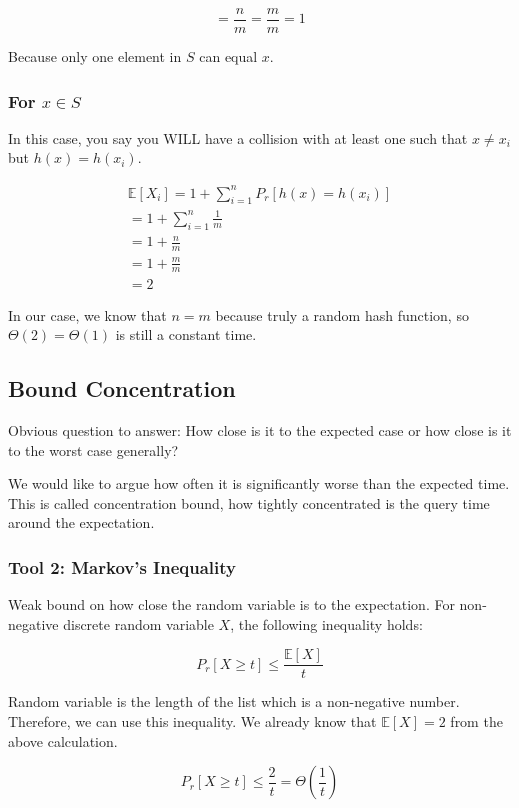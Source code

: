 \documentclass{article}
\begin{document}
$$
 = \frac{n}{m} = \frac{m}{m} = 1
$$

Because only one element in $S$ can equal $x$.

\subsubsection{For $x \in S$}

In this case, you say you WILL have a collision with at least one such that $x \neq x_i$ but $h(x) = h(x_i)$.

\begin{align*}
        \mathbb E[X_i] = 1 + \sum^{n}_{i=1} P_r[h(x) = h(x_i)] \\
        = 1 + \sum^{n}_{i=1} \frac{1}{m} \\
        = 1 + \frac{n}{m} \\
        = 1 + \frac{m}{m} \\
        = 2
\end{align*}

In our case, we know that $n = m$ because truly a random hash function, so $\Theta(2) = \Theta(1)$ is still a constant time.

\subsection{Bound Concentration}

Obvious question to answer: How close is it to the expected case or how close is it to the worst case generally?

We would like to argue how often it is significantly worse than the expected time. This is called concentration bound, how tightly concentrated is the query time around the expectation.

\subsubsection{Tool 2: Markov's Inequality}

Weak bound on how close the random variable is to the expectation. For non-negative discrete random variable $X$, the following inequality holds:

$$
P_r[X \geq t] \leq  \frac{\mathbb E[X]}{t}
$$

Random variable is the length of the list which is a non-negative number. Therefore, we can use this inequality. We already know that $\mathbb E[X] = 2$ from the above calculation.

$$
P_r[X \geq t] \leq  \frac{2}{t} = \Theta\left(\frac{1}{t}\right)
$$
\end{document}
